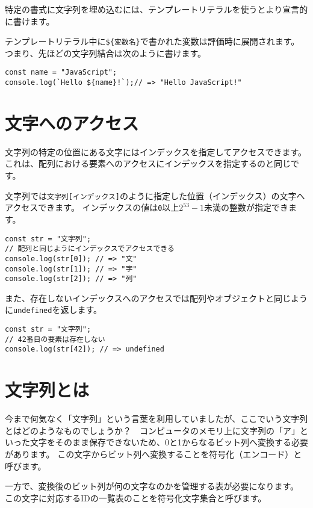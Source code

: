 特定の書式に文字列を埋め込むには、テンプレートリテラルを使うとより宣言的に書けます。

テンプレートリテラル中に\texttt{\$\{変数名\}}で書かれた変数は評価時に展開されます。
つまり、先ほどの文字列結合は次のように書けます。

\begin{lstlisting}
const name = "JavaScript";
console.log(`Hello ${name}!`);// => "Hello JavaScript!"
\end{lstlisting}

\hypertarget{get-char}{%
\section{文字へのアクセス}\label{get-char}}

文字列の特定の位置にある文字にはインデックスを指定してアクセスできます。
これは、配列における要素へのアクセスにインデックスを指定するのと同じです。

文字列では\texttt{文字列[インデックス]}のように指定した位置（インデックス）の文字へアクセスできます。
インデックスの値は\texttt{0}以上\texttt{$2^{53} - 1$}未満の整数が指定できます。

\begin{lstlisting}
const str = "文字列";
// 配列と同じようにインデックスでアクセスできる
console.log(str[0]); // => "文"
console.log(str[1]); // => "字"
console.log(str[2]); // => "列"
\end{lstlisting}

また、存在しないインデックスへのアクセスでは配列やオブジェクトと同じように\texttt{undefined}を返します。

\begin{lstlisting}
const str = "文字列";
// 42番目の要素は存在しない
console.log(str[42]); // => undefined
\end{lstlisting}

\hypertarget{what-is-string}{%
\section{文字列とは}\label{what-is-string}}

今まで何気なく「文字列」という言葉を利用していましたが、ここでいう文字列とはどのようなものでしょうか？　コンピュータのメモリ上に文字列の「ア」といった文字をそのまま保存できないため、0と1からなるビット列へ変換する必要があります。
この文字からビット列へ変換することを符号化（エンコード）と呼びます。

一方で、変換後のビット列が何の文字なのかを管理する表が必要になります。
この文字に対応するIDの一覧表のことを符号化文字集合と呼びます。

